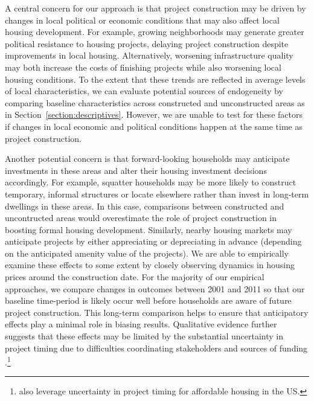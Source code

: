 \documentclass[12pt]{article}
\begin{document}
A central concern for our approach is that project construction may be driven by changes in local political or economic conditions that may also affect local housing development.  For example, growing neighborhoods may generate greater political resistance to housing projects, delaying project construction despite improvements in local housing.  Alternatively, worsening infrastructure quality may both increase the costs of finishing projects while also worsening local housing conditions.  To the extent that these trends are reflected in average levels of local characteristics, we can evaluate potential sources of endogeneity by comparing baseline characteristics across constructed and unconstructed areas as in Section~\ref{section:descriptives}.  However, we are unable to test for these factors if changes in local economic and political conditions happen at the same time as project construction.

Another potential concern is that forward-looking households may anticipate investments in these areas and alter their housing investment decisions accordingly.  For example, squatter households may be more likely to construct temporary, informal structures or locate elsewhere rather than invest in long-term dwellings in these areas.  In this case, comparisons between constructed and uncontructed areas would overestimate the role of project construction in boosting formal housing development.  Similarly, nearby housing markets may anticipate projects by either appreciating or depreciating in advance (depending on the anticipated amenity value of the projects).  We are able to empirically examine these effects to some extent by closely observing dynamics in housing prices around the construction date.  For the majority of our empirical approaches, we compare changes in outcomes between 2001 and 2011 so that our baseline time-period is likely occur well before households are aware of future project construction.  This long-term comparison helps to ensure that anticipatory effects play a minimal role in biasing results.  Qualitative evidence further suggests that these effects may be limited by the substantial uncertainty in project timing due to difficulties coordinating stakeholders and sources of funding \citep{serihistory}.\footnote{\cite{diamond2016wants} also leverage uncertainty in project timing for affordable housing in the US.}

\end{document}
